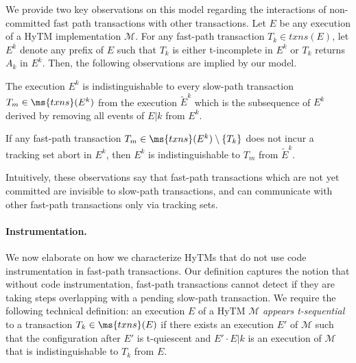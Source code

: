 We provide two key observations on this model regarding the interactions of non-committed fast path transactions 
with other transactions. 
Let $E$ be any execution of a HyTM implementation $\mathcal{M}$. 
For any fast-path transaction $T_k \in txns(E)$, 
let $E^k$ denote any prefix of $E$ such that $T_k$ is either t-incomplete in $E^k$ or $T_k$ returns $A_k$ in $E^k$. 
Then, the following observations are implied by our model.
%
\begin{observation} 
\label{ob:one}
The execution $E^k$ is indistinguishable to every slow-path transaction $T_m \in \ms{txns}(E^k)$ 
from the execution $\tilde{E}^k$ which is the subsequence of $E^k$ derived by removing all events of $E|k$ from $E^k$. 

If any fast-path transaction $T_m\in \ms{txns}(E^k) \setminus \{T_k\}$ does not incur a tracking set abort in $E^k$, 
then $E^k$ is indistinguishable to $T_m$ from $\tilde{E}^k$. 
\end{observation}
%
Intuitively, these observations say that fast-path transactions which are not yet committed are 
invisible to slow-path transactions, and can communicate with other fast-path transactions only via tracking sets.

\paragraph{Instrumentation.}
%
We now elaborate on how we characterize HyTMs that do not use code instrumentation in fast-path transactions.
Our definition captures the notion that without code instrumentation, fast-path transactions cannot detect
if they are taking steps overlapping with a pending slow-path transaction.
We require the following technical definition: an execution $E$ of a HyTM $\mathcal{M}$ \emph{appears t-sequential}
to a transaction $T_k \in \ms{txns}(E)$ if there exists an execution $E'$ of $\mathcal{M}$
such that the configuration after $E'$ is t-quiescent and $E'\cdot E|k$ is an execution of $\mathcal{M}$
that is indistinguishable to $T_k$ from $E$.


